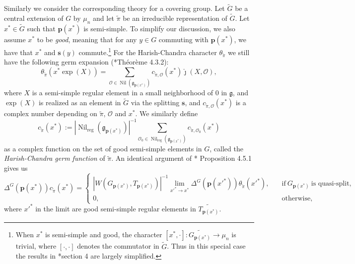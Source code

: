 \documentclass{amsart}
\numberwithin{equation}{section}
\newcommand{\car}[1]{\left|#1\right|}
\newcommand{\mrreg}{\operatorname{reg}}
\newcommand{\mrexp}{\operatorname{exp}}
\newcommand{\mrnil}{\operatorname{Nil}}
\newcommand{\mfg}{\mathfrak{g}}
\newcommand{\mco}{\mathcal{O}}
\newcommand{\bs}[1]{\boldsymbol{#1}}
\newcommand{\wt}[1]{\widetilde{#1}}
\begin{document}
	Similarly we consider the corresponding theory for a covering group. Let $\wt{G}$ be a central extension of $G$ by $\mu_{n}$ and let $\wt{\pi}$ be an irreducible representation of $\wt{G}$. Let $x^{*}\in\wt{G}$ such that $\bs{p}(x^{*})$ is semi-simple. To simplify our discussion, we also assume $x^{*}$ to be \emph{good}, meaning that for any $y\in G$ commuting with $\bs{p}(x^{*})$, we have that $x^{*}$  and $\bs{s}(y)$ commute.\footnote{When $x^{*}$ is semi-simple and good, the character $[x^{*},\cdot]:\wt{G_{\bs{p}(x^{*})}}\rightarrow\mu_{n}$ is trivial, where $[\cdot,\cdot]$ denotes the commutator in $\wt{G}$. Thus in this special case the results in \cite{li2012formule}*{section 4} are largely simplified.} For the Harish-Chandra character $\theta_{\wt{\pi}}$ we still have the following germ expansion (\cite{li2012formule}*{Th\'eor\`eme 4.3.2}):
	$$\theta_{\wt{\pi}}(x^{*}\mrexp(X))=\sum_{\mco\in\mrnil(\mfg_{\bs{p}(x^{*})})}c_{\wt{\pi},\mco}(x^{*})\hat{\jmath}(X,\mco),$$
	where $X$ is a semi-simple regular element in a small neighborhood of $0$ in $\mfg$, and $\mrexp(X)$ is realized as an element in $\wt{G}$ via the splitting $\bs{s}$, and $c_{\wt{\pi},\mco}(x^{*})$ is a complex number depending on $\wt{\pi}$, $\mco$ and $x^{*}$. We similarly define
	$$c_{\wt{\pi}}(x^{*}):=\car{\mrnil_{\mrreg}(\mfg_{\bs{p}(x^{*})})}^{-1}\sum_{\mco_{0}\in\mrnil_{\mrreg}(\mfg_{\bs{p}(x^{*})})}c_{\wt{\pi},\mco_{0}}(x^{*})$$ as a complex function on the set of good semi-simple elements in $G$, called the \emph{Harish-Chandra germ function} of $\wt{\pi}$. An identical argument of \cite{beuzart2020local}*{ Proposition 4.5.1} gives us 
	\begin{equation}\label{eqcpilimthetacover}
		\Delta^{G}(\bs{p}(x^{*}))c_{\wt{\pi}}(x^{*})=
		\begin{cases}
			\car{W(G_{\bs{p}(x^{*})},T_{\bs{p}(x^{*})})}^{-1}\lim_{x'^{*}\rightarrow x^{*}}\Delta^{G}(\bs{p}(x'^{*}))\theta_{\wt{\pi}}(x'^{*}),\quad&\text{if}\ G_{\bs{p}(x^{*})}\ \text{is quasi-split},\\
			0, \quad&\text{otherwise,}
		\end{cases}
	\end{equation}
	where $x'^{*}$ in the limit are good semi-simple regular elements in $\wt{T_{\bs{p}(x^{*})}}$.
	
\end{document}
